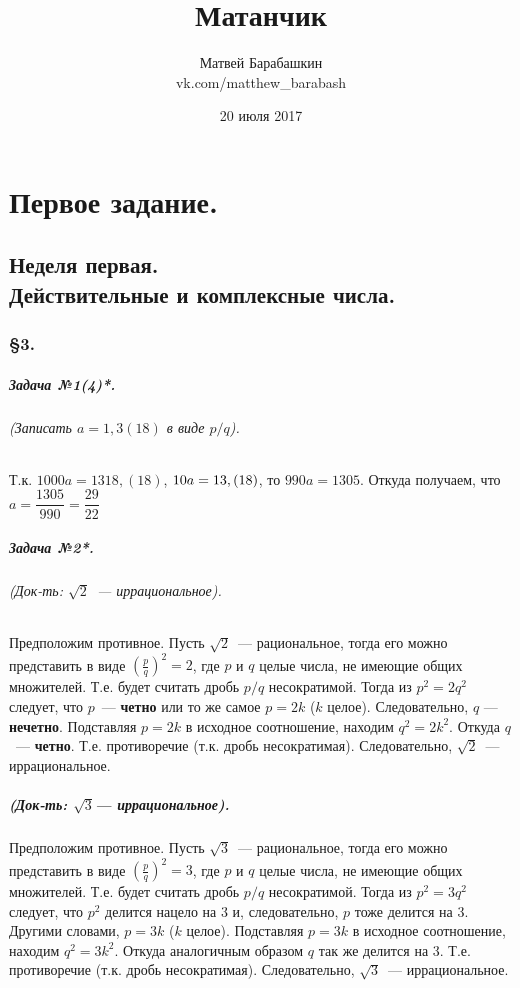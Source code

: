 \documentclass[a4paper,12pt]{report}
\author{Матвей Барабашкин\\vk.com/matthew\_barabash}
\title{Матанчик}
\date{20 июля 2017}
\newcommand*{\hm}[1]{#1\nobreak\discretionary{}
{\hbox{$\mathsurround=0pt #1$}}{}}
\begin{document}
\maketitle

\chapter*{Первое задание.}

\section*{Неделя первая.\\ Действительные и комплексные числа.}

\subsection*{\S3.\\}

\paragraph{Задача №1(4)*.}
\subparagraph{(Записать $ a=1,3(18) $ в виде $ p/q $).}
Т.к. $ 1000a=1318,(18) $, $ 10a\hm=13,(18) $, то 
$ 990a=1305 $. Откуда получаем, что $ a=\dfrac{1305}{990}=\dfrac{29}{22} $

\paragraph{Задача №2*.}\label{sqrt2}
\subparagraph{(Док-ть: $ \sqrt{2} $~--- иррациональное).}
Предположим противное.
Пусть $ \sqrt{2} $~--- рациональное, тогда
его можно представить в виде $ (\frac{p}{q})^2=2 $, где
$ p $ и $ q $ целые числа, не имеющие общих множителей.
Т.е. будет считать дробь $ p/q $ несократимой. Тогда
из $ p^2=2q^2 $ следует, что $ p $~--- \textbf{четно} или
то же самое $ p=2k $ ($ k $ целое). Следовательно,
$ q $ --- \textbf{нечетно}. 
Подставляя $ p=2k $ в исходное соотношение, находим
$ q^2=2k^2 $. Откуда $ q $~--- \textbf{четно}. 
Т.е. противоречие (т.к. дробь несократимая). Следовательно,
$ \sqrt{2} $~--- иррациональное.

\paragraph{(Док-ть: $ \sqrt{3} $--- иррациональное).}
Предположим противное.
Пусть $ \sqrt{3} $~--- рациональное, тогда
его можно представить в виде $ (\frac{p}{q})^2=3 $, где
$ p $ и $ q $ целые числа, не имеющие общих множителей.
Т.е. будет считать дробь $ p/q $ несократимой. Тогда
из $ p^2=3q^2 $ следует, что $ p^2 $ делится нацело на 3
и, следовательно, $ p $ тоже делится на 3.
Другими словами, $ p=3k $ ($ k $ целое).
Подставляя $ p=3k $ в исходное соотношение, находим
$ q^2=3k^2 $. Откуда аналогичным образом $ q $ так же делится на 3. 
Т.е. противоречие (т.к. дробь несократимая). Следовательно,
$ \sqrt{3} $~--- иррациональное.
\end{document}
